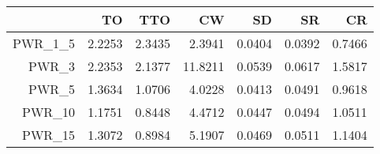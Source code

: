 \begin{tabular}{rrrrrrr}
  \toprule
 & TO & TTO & CW & SD & SR & CR \\ 
  \midrule
PWR\_1\_5 & 2.2253 & 2.3435 & 2.3941 & 0.0404 & 0.0392 & 0.7466 \\ 
  PWR\_3 & 2.2353 & 2.1377 & 11.8211 & 0.0539 & 0.0617 & 1.5817 \\ 
  PWR\_5 & 1.3634 & 1.0706 & 4.0228 & 0.0413 & 0.0491 & 0.9618 \\ 
  PWR\_10 & 1.1751 & 0.8448 & 4.4712 & 0.0447 & 0.0494 & 1.0511 \\ 
  PWR\_15 & 1.3072 & 0.8984 & 5.1907 & 0.0469 & 0.0511 & 1.1404 \\ 
   \bottomrule
\end{tabular}
